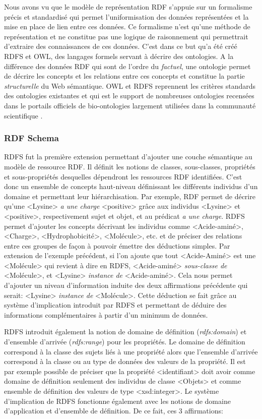 Nous avons vu que le modèle de représentation RDF s'appuie sur un formalisme précis et standardisé qui permet l'uniformisation des données représentées et la mise en place de lien entre ces données. Ce formalisme n'est qu'une méthode de représentation et ne constitue pas une logique de raisonnement qui permettrait d'extraire des connaissances de ces données. C'est dans ce but qu'a été créé RDFS et OWL, des langages formels servant à décrire des ontologies. A la différence des données RDF qui sont de l'ordre du \textit{factuel}, une ontologie permet de décrire les concepts et les relations entre ces concepts et constitue la partie \textit{structurelle} du Web sémantique.
OWL et RDFS reprennent les critères standards des ontologies existantes et qui est le support de nombreuses ontologies recensées dans le portails officiels de bio-ontologies largement utilisées dans la communauté scientifique \cite{smith_obo_2007}.

\subsubsection{RDF Schema} \label{rdfs}

RDFS fut la première extension permettant d'ajouter une couche sémantique au modèle de ressource RDF. Il définit les notions de classes, sous-classes, propriétés et sous-propriétés desquelles dépendront les ressources RDF identifiées. C'est donc un ensemble de concepts haut-niveau définissant les différents individus d'un domaine et permettant leur hiérarchisation. 
Par exemple, RDF permet de décrire qu'une <Lysine> \textit{a une charge} <positive> grâce aux individus <Lysine> et <positive>, respectivement sujet et objet, et au prédicat \textit{a une charge}. RDFS permet d'ajouter les concepts décrivant les individus comme <Acide-aminé>, <Charge>, <Hydrophobicité>, <Molécule>, etc. et de préciser des relations entre ces groupes de façon à pouvoir émettre des déductions simples. Par extension de l'exemple précédent, si l'on ajoute que tout <Acide-Aminé> est une <Molécule> qui revient à dire en RDFS, <Acide-aminé> \textit{sous-classe de} <Molécule>, et <Lysine> \textit{instance de} <Acide-aminé>. Cela nous permet d'ajouter un niveau d'information induite des deux affirmations précédente qui serait: <Lysine> \textit{instance de} <Molécule>. Cette déduction se fait grâce au système d'implication introduit par RDFS et permettant de déduire des informations complémentaires à partir d'un minimum de données.

RDFS introduit également la notion de domaine de définition (\textit{rdfs:domain}) et d'ensemble d'arrivée (\textit{rdfs:range}) pour les propriétés. Le domaine de définition correspond à la classe des sujets liés à une propriété alors que l'ensemble d'arrivée correspond à la classe ou au type de données des valeurs de la propriété. Il est par exemple possible de préciser que la propriété <identifiant> doit avoir comme domaine de définition seulement des individus de classe <Objets> et comme ensemble de définition des valeurs de type <xsd:integer>.
Le système d'implication de RDFS fonctionne également avec les notions de domaine d'application et d'ensemble de définition. De ce fait, ces 3 affirmations:


